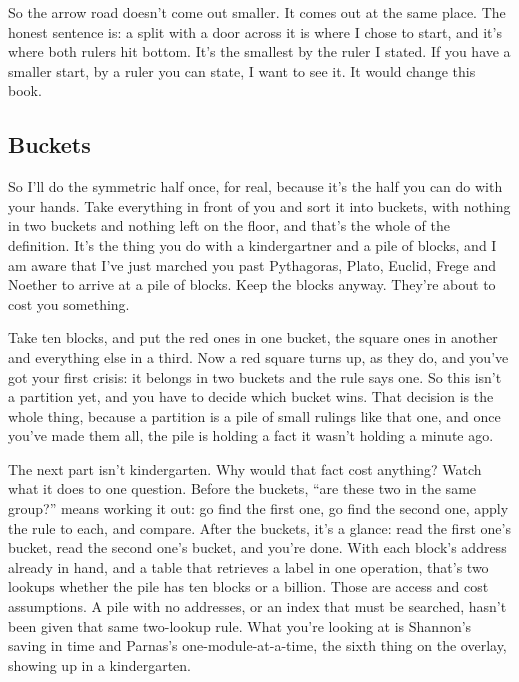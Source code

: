 \documentclass[11pt,twoside]{article}
\theoremstyle{thielethm}
\theoremstyle{thieledef}
\theoremstyle{thieledef}
\theoremstyle{thieledef}
\theoremstyle{thielethm}
\theoremstyle{thieleobs}
\theoremstyle{thielethm}
\begin{document}
So the arrow road doesn't come out smaller. It comes out at the same place. The honest sentence is: a split with a door across it is where I chose to start, and it's where both rulers hit bottom. It's the smallest by the ruler I stated. If you have a smaller start, by a ruler you can state, I want to see it. It would change this book.

\subsection{Buckets}

So I'll do the symmetric half once, for real, because it's the half you can do with your hands. Take everything in front of you and sort it into buckets, with nothing in two buckets and nothing left on the floor, and that's the whole of the definition. It's the thing you do with a kindergartner and a pile of blocks, and I am aware that I've just marched you past Pythagoras, Plato, Euclid, Frege and Noether to arrive at a pile of blocks. Keep the blocks anyway. They're about to cost you something.

Take ten blocks, and put the red ones in one bucket, the square ones in another and everything else in a third. Now a red square turns up, as they do, and you've got your first crisis: it belongs in two buckets and the rule says one. So this isn't a partition yet, and you have to decide which bucket wins. That decision is the whole thing, because a partition is a pile of small rulings like that one, and once you've made them all, the pile is holding a fact it wasn't holding a minute ago.

The next part isn't kindergarten. Why would that fact cost anything? Watch what it does to one question. Before the buckets, ``are these two in the same group?'' means working it out: go find the first one, go find the second one, apply the rule to each, and compare. After the buckets, it's a glance: read the first one's bucket, read the second one's bucket, and you're done. With each block's address already in hand, and a table that retrieves a label in one operation, that's two lookups whether the pile has ten blocks or a billion. Those are access and cost assumptions. A pile with no addresses, or an index that must be searched, hasn't been given that same two-lookup rule. What you're looking at is Shannon's saving in time and Parnas's one-module-at-a-time, the sixth thing on the overlay, showing up in a kindergarten.
\end{document}
